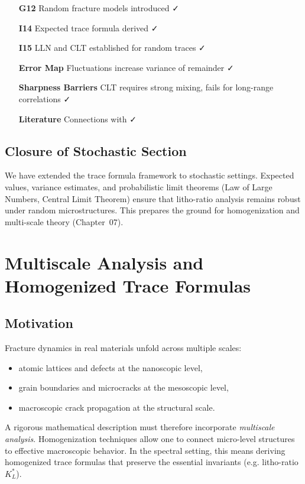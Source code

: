\begin{itemize}
  \item[\textbf{G12}] Random fracture models introduced ✓
  \item[\textbf{I14}] Expected trace formula derived ✓
  \item[\textbf{I15}] LLN and CLT established for random traces ✓
  \item[\textbf{Error Map}] Fluctuations increase variance of remainder ✓
  \item[\textbf{Sharpness Barriers}] CLT requires strong mixing, fails for long-range correlations ✓
  \item[\textbf{Literature}] Connections with
  \cite{DalMaso1993, Bourdin2008, FriezeKannan1999, Billingsley1995} ✓
\end{itemize}

\subsection*{Closure of Stochastic Section}

We have extended the trace formula framework to stochastic settings.  
Expected values, variance estimates, and probabilistic limit theorems
(Law of Large Numbers, Central Limit Theorem) ensure that litho-ratio
analysis remains robust under random microstructures.  
This prepares the ground for homogenization and multi-scale theory
(Chapter~07).

\section{Multiscale Analysis and Homogenized Trace Formulas}
\label{sec:multiscale-trace}

\subsection{Motivation}

Fracture dynamics in real materials unfold across multiple scales:  
\begin{itemize}
  \item atomic lattices and defects at the nanoscopic level,  
  \item grain boundaries and microcracks at the mesoscopic level,  
  \item macroscopic crack propagation at the structural scale.  
\end{itemize}

A rigorous mathematical description must therefore incorporate \emph{multiscale analysis}.  
Homogenization techniques allow one to connect micro-level structures to effective macroscopic behavior.  
In the spectral setting, this means deriving homogenized trace formulas that preserve the essential invariants (e.g. litho-ratio $K_L^*$).

